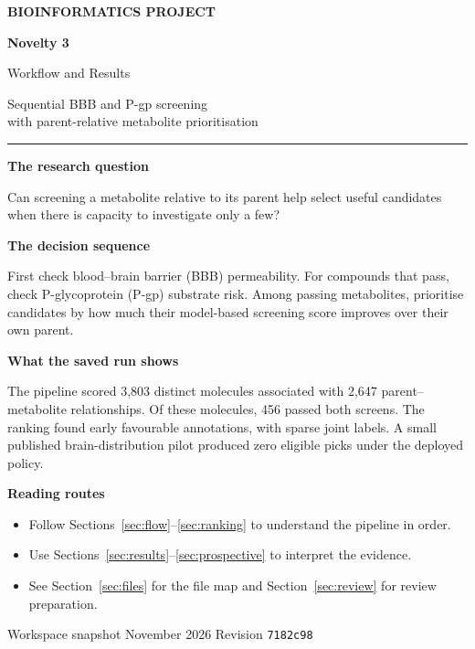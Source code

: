 \documentclass[11pt,a4paper]{article}
\newenvironment{compact}{\begin{itemize}[leftmargin=*,topsep=2pt,itemsep=1pt,parsep=0pt]}{\end{itemize}}
\begin{document}
\hypersetup{pageanchor=false}
\begin{titlepage}
\thispagestyle{empty}
\vspace*{20mm}
{\large\color{Teal}\bfseries BIOINFORMATICS PROJECT\par}
\vspace{7mm}
{\fontsize{37}{42}\selectfont\bfseries\color{Navy} Novelty 3\par}
{\fontsize{22}{27}\selectfont\color{Navy} Workflow and Results\par}
\vspace{6mm}
{\large\color{Slate} Sequential BBB and P-gp screening\\
with parent-relative metabolite prioritisation\par}
\vspace{8mm}
{\color{Teal}\rule{\linewidth}{1.2pt}}
\vspace{5mm}

\textbf{The research question}\par
Can screening a metabolite relative to its parent help select useful candidates when there is capacity to investigate only a few?

\textbf{The decision sequence}\par
First check blood--brain barrier (BBB) permeability. For compounds that pass, check P-glycoprotein (P-gp) substrate risk. Among passing metabolites, prioritise candidates by how much their model-based screening score improves over their own parent.

\textbf{What the saved run shows}\par
The pipeline scored 3,803 distinct molecules associated with 2,647 parent--metabolite relationships. Of these molecules, 456 passed both screens. The ranking found early favourable annotations, with sparse joint labels. A small published brain-distribution pilot produced zero eligible picks under the deployed policy.

\vfill
\textbf{Reading routes}\par
\begin{compact}
\item Follow Sections~\ref{sec:flow}--\ref{sec:ranking} to understand the pipeline in order.
\item Use Sections~\ref{sec:results}--\ref{sec:prospective} to interpret the evidence.
\item See Section~\ref{sec:files} for the file map and Section~\ref{sec:review} for review preparation.
\end{compact}

\vspace{8mm}
{\small\color{Slate}Workspace snapshot  November 2026 \quad Revision \texttt{7182c98}\par}
\end{titlepage}
\setcounter{page}{2}
\hypersetup{pageanchor=true}
\tableofcontents
\end{document}
